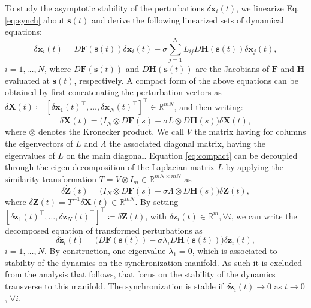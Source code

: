 \documentclass[%
 reprint,
 amsmath,amssymb,
 aip,
]{revtex4-2}
\def \bF {\pmb{F}}
\def \bH {\pmb{H}}
\def \bx {\pmb{x}}
\def \bX {\pmb{X}}
\def \bz {\pmb{z}}
\def \bZ {\pmb{Z}}
\def \bs {\pmb{s}}
\theoremstyle{italichead}
\theoremstyle{definition}
\begin{document}
{To study the asymptotic stability of the perturbations $\delta \bx_i (t)$, we linearize Eq.\,\eqref{eq:synch} about $\bs(t)$ and derive the following linearized sets of dynamical equations:
\begin{equation} \label{eq:dx}
    \delta \dot{\bx}_i (t) = D\bF(\bs(t)) \delta \bx_i(t) - \sigma \sum_{j = 1}^{N} L_{ij} D\bH (\bs(t)) \delta \bx_j (t),
\end{equation}
$i = 1, \hdots, N$, where $D\bF (\bs(t))$ and $D \bH(\bs(t))$ are the Jacobians of $\bF$ and $\bH$ evaluated at $\bs(t)$, respectively.
A compact form of the above equations can be obtained by first concatenating the perturbation vectors as $\delta \bX(t) \coloneq \left[\delta \bx_1 (t)^\top, \hdots, \delta \bx_N (t)^\top \right]^\top \in \mathbb{R}^{mN}$, and then writing:
\begin{equation} \label{eq:compact}
    \delta \dot{\bX} (t) = \Bigg(I_N \otimes D \bF(s) - \sigma L \otimes D\bH(s)\Bigg) \delta \bX(t),  
\end{equation}
where $\otimes$ denotes the Kronecker product. We call $V$ the matrix having for columns the eigenvectors of $L$ and $\Lambda$ the associated diagonal matrix, having the eigenvalues of $L$ on the main diagonal.
Equation \eqref{eq:compact} can be decoupled through the eigen-decomposition of the Laplacian matrix $L$ by applying the similarity transformation $T = V \otimes I_m \in \mathbb{R}^{mN \times mN}$ as
\begin{equation} \label{eq:compact1}
    \delta \dot{\bZ} (t) = \Bigg(I_N \otimes D \bF(s) - \sigma \Lambda \otimes D\bH(s)\Bigg) \delta \bZ(t),  
\end{equation}
where $\delta \bZ (t) = T^{-1} \delta \bX (t) \in \mathbb{R}^{mN}$. 
By setting $[\delta \bz_1(t)^{\top}, \hdots , \delta \bz_N (t)^\top]^\top \coloneq \delta \bZ (t)$, with $\delta \bz_i (t) \in \mathbb{R}^m, \forall i$, we can write the decomposed equation of transformed perturbations as
\begin{equation} \label{dzi}
    \delta \dot{\bz}_i (t) = \Bigg(D\bF(\bs(t)) - \sigma \lambda_i D\bH(\bs (t)) \Bigg) \delta \bz_i (t),
\end{equation}
$i = 1, \hdots, N$. By construction, one eigenvalue $\lambda_1=0$, which is associated to stability of the dynamics on the synchronization manifold. As such it is excluded from the analysis that follows, that focus on the stability of the dynamics transverse to this manifold.
The synchronization is stable if $\delta \dot{\bz}_i (t) \to 0$ as $t \to 0$, $\forall i$.

}
\end{document}
